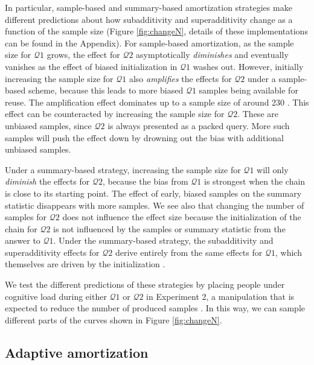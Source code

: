 In particular, sample-based and summary-based amortization strategies make different predictions about how subadditivity and superadditivity change as a function of the sample size (Figure \ref{fig:changeN}, details of these implementations can be found in the Appendix).
For sample-based amortization, as the sample size for $\mathcal{Q}1$ grows, the effect for $\mathcal{Q}2$ asymptotically \emph{diminishes} and eventually vanishes as the effect of biased initialization in $\mathcal{Q}1$ washes out. However, initially increasing the sample size for $\mathcal{Q}1$ also \emph{amplifies} the effects for $\mathcal{Q}2$ under a sample-based scheme, because this leads to more biased $\mathcal{Q}1$ samples being available for reuse. The amplification effect dominates up to a sample size of around 230 \citep[estimate for the number of samples taken for inference in this domain, reported in][]{dasgupta17}. This effect can be counteracted by increasing the sample size for $\mathcal{Q}2$. These are unbiased samples, since $\mathcal{Q}2$ is always presented as a packed query. More such samples will push the effect down by drowning out the bias with additional unbiased samples. 

Under a summary-based strategy, increasing the sample size for $\mathcal{Q}1$ will only \emph{diminish} the effects for $\mathcal{Q}2$, because the bias from $\mathcal{Q}1$ is strongest when the chain is close to its starting point. The effect of early, biased samples on the summary statistic disappears with more samples. We see also that changing the number of samples for $\mathcal{Q}2$ does not influence the effect size because the initialization of the chain for $\mathcal{Q}2$ is not influenced by the samples or summary statistic from the answer to $\mathcal{Q}1$. Under the summary-based strategy, the subadditivity and superadditivity effects for $\mathcal{Q}2$ derive entirely from the same effects for $\mathcal{Q}1$, which themselves are driven by the initialization \citep[see][]{dasgupta17}.

We test the different predictions of these strategies by placing people under cognitive load during either $\mathcal{Q}1$ or $\mathcal{Q}2$ in Experiment 2, a manipulation that is expected to reduce the number of produced samples \citep{dasgupta17,thaker17}. In this way, we can sample different parts of the curves shown in Figure \ref{fig:changeN}.

\subsection{Adaptive amortization}

